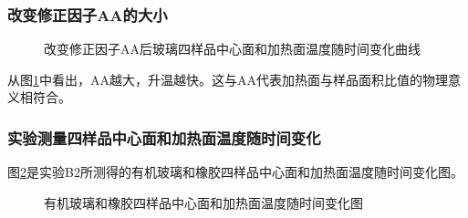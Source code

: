 \documentclass[10pt,a4paper,twoside,UTF8]{ctexart}
\begin{document}
\subsubsection{改变修正因子AA的大小}
\begin{figure}[H]
	\centering
	\caption{改变修正因子AA后玻璃四样品中心面和加热面温度随时间变化曲线}
	\label{fig: Mod5}
\end{figure}

从图\ref{fig: Mod5}中看出，AA越大，升温越快。这与AA代表加热面与样品面积比值的物理意义相符合。

\subsubsection{实验测量四样品中心面和加热面温度随时间变化}
图\ref{fig: Mod6}是实验B2所测得的有机玻璃和橡胶四样品中心面和加热面温度随时间变化图。
\begin{figure}[H]
	\centering
	\caption{有机玻璃和橡胶四样品中心面和加热面温度随时间变化图}
	\label{fig: Mod6}
\end{figure}
\end{document}
